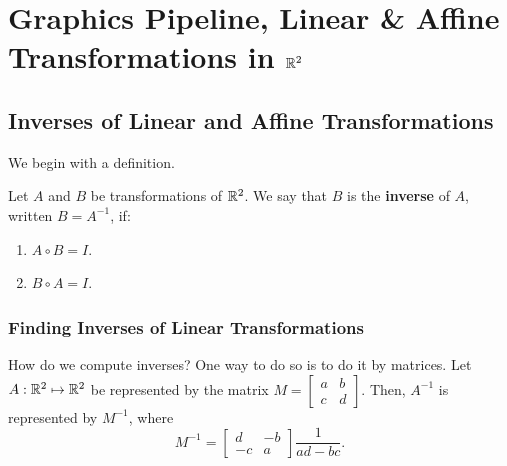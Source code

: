 \documentclass[letterpaper]{article}
\begin{document}

\section{Graphics Pipeline, Linear \& Affine Transformations in \texorpdfstring{$\mathbb{R}^2$}{R2}}

\subsection{Inverses of Linear and Affine Transformations}
We begin with a definition. 
\begin{definition}{}{}
    Let $A$ and $B$ be transformations of $\mathbb{R}^2$. We say that $B$ is the \textbf{inverse} of $A$, written $B = A^{-1}$, if: 
    \begin{enumerate}
        \item $A \circ B = I$. 
        \item $B \circ A = I$. 
    \end{enumerate}
\end{definition}

\subsubsection{Finding Inverses of Linear Transformations}
How do we compute inverses? One way to do so is to do it by matrices. Let $A: \mathbb{R}^2 \mapsto \mathbb{R}^2$ be represented by the matrix $M = \begin{bmatrix}
    a & b \\ c & d
\end{bmatrix}$. Then, $A^{-1}$ is represented by $M^{-1}$, where 
\[M^{-1} = \begin{bmatrix}
    d & -b \\ 
    -c & a
\end{bmatrix} \frac{1}{ad - bc}.\]
\end{document}
